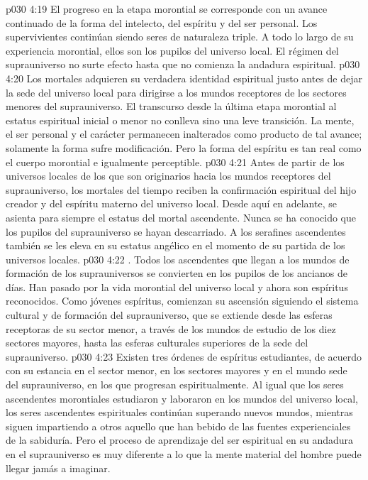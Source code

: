 \vs p030 4:19 El progreso en la etapa morontial se corresponde con un avance continuado de la forma del intelecto, del espíritu y del ser personal. Los supervivientes continúan siendo seres de naturaleza triple. A todo lo largo de su experiencia morontial, ellos son los pupilos del universo local. El régimen del suprauniverso no surte efecto hasta que no comienza la andadura espiritual.
\vs p030 4:20 Los mortales adquieren su verdadera identidad espiritual justo antes de dejar la sede del universo local para dirigirse a los mundos receptores de los sectores menores del suprauniverso. El transcurso desde la última etapa morontial al estatus espiritual inicial o menor no conlleva sino una leve transición. La mente, el ser personal y el carácter permanecen inalterados como producto de tal avance; solamente la forma sufre modificación. Pero la forma del espíritu es tan real como el cuerpo morontial e igualmente perceptible.
\vs p030 4:21 Antes de partir de los universos locales de los que son originarios hacia los mundos receptores del suprauniverso, los mortales del tiempo reciben la confirmación espiritual del hijo creador y del espíritu materno del universo local. Desde aquí en adelante, se asienta para siempre el estatus del mortal ascendente. Nunca se ha conocido que los pupilos del suprauniverso se hayan descarriado. A los serafines ascendentes también se les eleva en su estatus angélico en el momento de su partida de los universos locales.
\vs p030 4:22 . Todos los ascendentes que llegan a los mundos de formación de los suprauniversos se convierten en los pupilos de los ancianos de días. Han pasado por la vida morontial del universo local y ahora son espíritus reconocidos. Como jóvenes espíritus, comienzan su ascensión siguiendo el sistema cultural y de formación del suprauniverso, que se extiende desde las esferas receptoras de su sector menor, a través de los mundos de estudio de los diez sectores mayores, hasta las esferas culturales superiores de la sede del suprauniverso.
\vs p030 4:23 Existen tres órdenes de espíritus estudiantes, de acuerdo con su estancia en el sector menor, en los sectores mayores y en el mundo sede del suprauniverso, en los que progresan espiritualmente. Al igual que los seres ascendentes morontiales estudiaron y laboraron en los mundos del universo local, los seres ascendentes espirituales continúan superando nuevos mundos, mientras siguen impartiendo a otros aquello que han bebido de las fuentes experienciales de la sabiduría. Pero el proceso de aprendizaje del ser espiritual en su andadura en el suprauniverso es muy diferente a lo que la mente material del hombre puede llegar jamás a imaginar.
